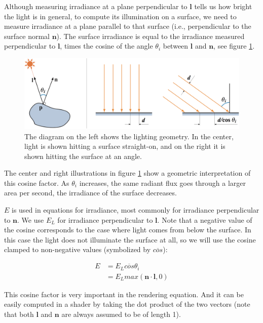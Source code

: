 Although measuring irradiance at a plane perpendicular to $\mathbf{l}$ tells us how bright the light is in general, to compute its illumination on a surface, we need to measure irradiance at a plane parallel to that surface (i.e., perpendicular to the surface normal $\mathbf{n}$). The surface irradiance is equal to the irradiance measured perpendicular to $\mathbf{l}$, times the cosine of the angle $\theta_i$ between $\mathbf{l}$ and $\mathbf{n}$, see figure \ref{f:irradiance-cosine-term}.

\begin{figure}
	\includegraphics[width=1.\textwidth]{graphics/gi/irradiance-cosine-term}
	\caption{The diagram on the left shows the lighting geometry. In the center, light is shown hitting a surface straight-on, and on the right it is shown hitting the surface at an angle.}
	\label{f:irradiance-cosine-term}
\end{figure}

The center and right illustrations in figure \ref{f:irradiance-cosine-term} show a geometric interpretation of this cosine factor. As $\theta_i$ increases, the same radiant flux goes through a larger area per second, the irradiance of the surface decreases. 

$E$ is used in equations for irradiance, most commonly for irradiance perpendicular to $\mathbf{n}$. We use $E_L$ for irradiance perpendicular to $\mathbf{l}$. Note that a negative value of the cosine corresponds to the case where light comes from below the surface. In this case the light does not illuminate the surface at all, so we will use the cosine clamped to non-negative values (symbolized by $\overline{cos}$):

\begin{equation}
	\begin{aligned}
		E&=E_L \overline{cos}\theta_i\\
		&=E_L max(\mathbf{n}\cdot\mathbf{l},0)
	\end{aligned}
\end{equation}

This cosine factor is very important in the rendering equation. And it can be easily computed in a shader by taking the dot product of the two vectors (note that both $\mathbf{l}$ and $\mathbf{n}$ are always assumed to be of length 1). 

